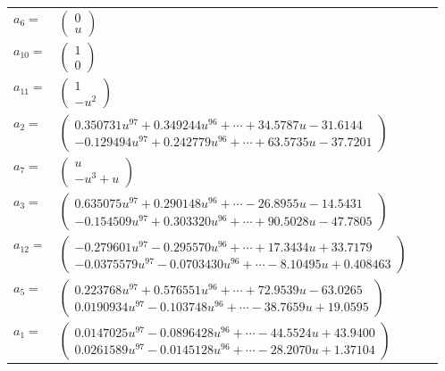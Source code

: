 \documentclass[1p]{elsarticle_modified}
\theoremstyle{definition}
\begin{document}
\begin{tabular}{m{7pt} m{180pt} m{7pt} m{180pt} }
\flushright $a_{6}=$&$\begin{pmatrix}0\\u\end{pmatrix}$ \\
\flushright $a_{10}=$&$\begin{pmatrix}1\\0\end{pmatrix}$ \\
\flushright $a_{11}=$&$\begin{pmatrix}1\\- u^2\end{pmatrix}$ \\
\flushright $a_{2}=$&$\begin{pmatrix}0.350731 u^{97}+0.349244 u^{96}+\cdots+34.5787 u-31.6144\\-0.129494 u^{97}+0.242779 u^{96}+\cdots+63.5735 u-37.7201\end{pmatrix}$ \\
\flushright $a_{7}=$&$\begin{pmatrix}u\\- u^3+u\end{pmatrix}$ \\
\flushright $a_{3}=$&$\begin{pmatrix}0.635075 u^{97}+0.290148 u^{96}+\cdots-26.8955 u-14.5431\\-0.154509 u^{97}+0.303320 u^{96}+\cdots+90.5028 u-47.7805\end{pmatrix}$ \\
\flushright $a_{12}=$&$\begin{pmatrix}-0.279601 u^{97}-0.295570 u^{96}+\cdots+17.3434 u+33.7179\\-0.0375579 u^{97}-0.0703430 u^{96}+\cdots-8.10495 u+0.408463\end{pmatrix}$ \\
\flushright $a_{5}=$&$\begin{pmatrix}0.223768 u^{97}+0.576551 u^{96}+\cdots+72.9539 u-63.0265\\0.0190934 u^{97}-0.103748 u^{96}+\cdots-38.7659 u+19.0595\end{pmatrix}$ \\
\flushright $a_{1}=$&$\begin{pmatrix}0.0147025 u^{97}-0.0896428 u^{96}+\cdots-44.5524 u+43.9400\\0.0261589 u^{97}-0.0145128 u^{96}+\cdots-28.2070 u+1.37104\end{pmatrix}$ \\

\end{tabular}
\end{document}
